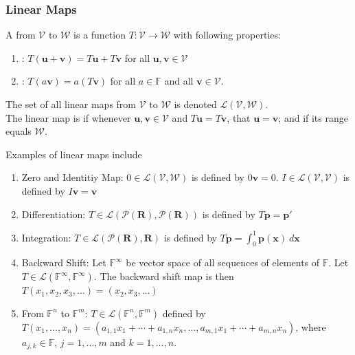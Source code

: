 \subsubsection{Linear Maps}

\begin{definition} A  from $\mathcal{V}$ to $\mathcal{W}$ is a function $T: \mathcal{V} \rightarrow \mathcal{W}$ with following properties:
\begin{enumerate}[label=\roman*.]
\setlength{\itemsep}{0pt}
\item {}: $T(\mathbf{u} + \mathbf{v}) = T\mathbf{u} + T\mathbf{v}$ for all $\mathbf{u}, \mathbf{v} \in \mathcal{V}$
\item {}: $T(a\mathbf{v}) = a(T\mathbf{v})$ for all $a \in \mathbb{F}$ and all $\mathbf{v} \in \mathcal{V}$.
\end{enumerate}
The set of all linear maps from $\mathcal{V}$ to $\mathcal{W}$ is denoted $\mathcal{L}(\mathcal{V}, \mathcal{W})$.\\
The linear map is  if whenever $\mathbf{u}, \mathbf{v} \in \mathcal{V}$ and $T\mathbf{u} = T\mathbf{v}$, that $\mathbf{u} = \mathbf{v}$; and  if its range equals $\mathcal{W}$.
\end{definition}

\begin{example} Examples of linear maps include
\begin{enumerate}[label=\roman*.]
\setlength{\itemsep}{0pt}
\item Zero and Identitiy Map: $0 \in \mathcal{L}(\mathcal{V}, \mathcal{W})$ is defined by $0 \mathbf{v} = 0$. $I \in \mathcal{L}(\mathcal{V}, \mathcal{V})$ is defined by $I \mathbf{v} = \mathbf{v}$
\item Differentiation: $T \in \mathcal{L}(\mathcal{P}(\mathbf{R}), \mathcal{P}(\mathbf{R}))$ is defined by $T \mathbf{p} = \mathbf{p}'$
\item Integration: $T \in \mathcal{L}(\mathcal{P}(\mathbf{R}), \mathbf{R})$ is defined by $T \mathbf{p} = \int_0^1 \mathbf{p}(\mathbf{x}) \ d \mathbf{x}$
\item Backward Shift: Let $\mathbb{F}^{\infty}$ be vector space of all sequences of elements of $\mathbb{F}$. Let $T \in \mathcal{L}(\mathbb{F}^{\infty}, \mathbb{F}^{\infty})$. The backward shift map is then $T(x_1, x_2, x_3, \ldots) = (x_2, x_3, \ldots)$
\item From $\mathbb{F}^{n}$ to $\mathbb{F}^{m}$: $T \in \mathcal{L}(\mathbb{F}^{n}, \mathbb{F}^{m})$ defined by $T(x_1, \ldots, x_n) = (a_{1,1} x_1 + \cdots + a_{1,n} x_n, \ldots, a_{m,1} x_1 + \cdots + a_{m,n} x_n)$, where $a_{j,k} \in \mathbb{F}$, $j=1, \ldots, m$ and $k=1, \ldots, n$.
\end{enumerate}
\end{example}

